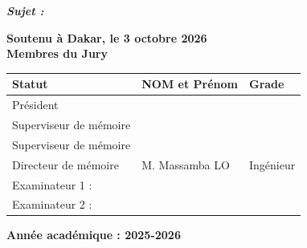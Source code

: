 \documentclass[12pt,a4paper]{report}
\begin{document}
\begin{titlepage}
    \raggedright{\bfseries\itshape\large Sujet :}\\[0.2cm]
    \centering
    \vfill

    \hfill{\bfseries\small Soutenu à Dakar, le 3 octobre 2026}\\[0.8cm]

    {\bfseries\large Membres du Jury}\\[0.2cm]
    \small
    \begin{tabular}{|l|m{6.5cm}|l|}
        \hline
        \textbf{Statut} & \textbf{NOM et Prénom} & \textbf{Grade} \\ \hline
        Président & & \\ \hline
        Superviseur de mémoire & & \\ \hline
        Superviseur de mémoire & & \\ \hline
        Directeur de mémoire & M. Massamba LO & Ingénieur \\ \hline
        Examinateur 1 : & & \\ \hline
        Examinateur 2 : & & \\ \hline
    \end{tabular}
    \vfill

    {\bfseries\large Année académique : 2025-2026}

\end{titlepage}
\end{document}
